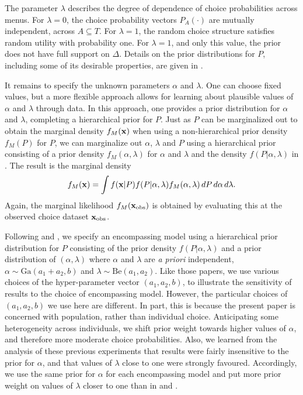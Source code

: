 \documentclass[11pt,letter]{article}
\newcommand{\menus}{menus}
\begin{document}
The parameter $\lambda$ describes the degree of dependence of choice probabilities across \menus{}.
For $\lambda = 0$, the choice probability vectors $P_A(\cdot)$ are mutually independent, across $A \subseteq T$.
For $\lambda = 1$, the random choice structure satisfies random utility with probability one.
For $\lambda = 1$, and only this value, the prior does not have full support on $\Delta$.
Details on the prior distributions for $P$, including some of its desirable properties, are given in .

It remains to specify the unknown parameters $\alpha$ and $\lambda$.
One can choose fixed values, but a more flexible approach allows for learning about plausible values of $\alpha$ and $\lambda$ through data.
In this approach, one provides a prior distribution for $\alpha$ and $\lambda$, completing a hierarchical prior for $P$.
Just as $P$ can be marginalized out to obtain the marginal density $f_M({\bf x})$ when using a non-hierarchical prior density $f_M(P)$ for $P$, we can marginalize out $\alpha$, $\lambda$ and $P$ using a hierarchical prior consisting of a prior density $f_M(\alpha,\lambda)$ for $\alpha$ and $\lambda$ and the density $f(P|\alpha,\lambda)$ in .
The result is the marginal density
\[
  f_M({\bf x}) = \int f({\bf x}|P) f(P|\alpha,\lambda) f_M(\alpha,\lambda) \, dP\, d\alpha\, d\lambda.
\]
Again, the marginal likelihood $f_M({\bf x}_{\mathrm{obs}})$ is obtained by evaluating this at the observed choice dataset ${\bf x}_{\mathrm{obs}}$.

Following  and , we specify an encompassing model using a hierarchical prior distribution for $P$ consisting of the prior density $f(P|\alpha,\lambda)$ and a prior distribution of $(\alpha,\lambda)$ where $\alpha$ and $\lambda$ are {\em a priori} independent, $\alpha \sim \mathrm{Ga}(a_1 + a_2, b)$ and $\lambda \sim \mathrm{Be}(a_1,a_2)$.
Like those papers, we use various choices of the hyper-parameter vector $(a_1,a_2,b)$, to illustrate the sensitivity of results to the choice of encompassing model.
However, the particular choices of $(a_1,a_2,b)$ we use here are different.
In part, this is because the present paper is concerned with population, rather than individual choice.
Anticipating some heterogeneity across individuals, we shift prior weight towards higher values of $\alpha$, and therefore more moderate choice probabilities.
Also, we learned from the analysis of these previous experiments that results were fairly insensitive to the prior for $\alpha$, and that values of $\lambda$ close to one were strongly favoured.
Accordingly, we use the same prior for $\alpha$ for each encompassing model and put more prior weight on values of $\lambda$ closer to one than in  and .
\end{document}
